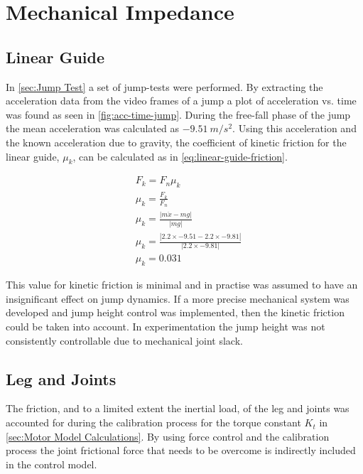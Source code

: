 \section{Mechanical Impedance}
\label{sec:Mechanical Impedance}
\subsection{Linear Guide}

In \cref{sec:Jump Test} a set of jump-tests were performed. By extracting the acceleration data from the video frames of a jump a plot of acceleration vs. time was found as seen in \cref{fig:acc-time-jump}. During the free-fall phase of the jump the mean acceleration was calculated as $-9.51\ m/s^2$. Using this acceleration and the known acceleration due to gravity, the coefficient of kinetic friction for the linear guide, $\mu_k$, can be calculated as in \cref{eq:linear-guide-friction}.  

\begin{equation} \label{eq:linear-guide-friction}
\begin{aligned}
&F_k = F_n \mu_k \\
&\mu_k = \frac{F_k}{F_n} \\
&\mu_k = \frac{|m\ddot{x} - mg|}{|mg|} \\
&\mu_k = \frac{|2.2\times -9.51 - 2.2\times -9.81|}{|2.2\times -9.81|} \\
&\mu_k = 0.031
\end{aligned}
\end{equation}

This value for kinetic friction is minimal and in practise was assumed to have an insignificant effect on jump dynamics. If a more precise mechanical system was developed and jump height control was implemented, then the kinetic friction could be taken into account. In experimentation the jump height was not consistently controllable due to mechanical joint slack.

\subsection{Leg and Joints}

The friction, and to a limited extent the inertial load, of the leg and joints was accounted for during the calibration process for the torque constant $K_t$ in \cref{sec:Motor Model Calculations}. By using force control and the calibration process the joint frictional force that needs to be overcome is indirectly included in the control model.

